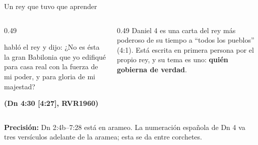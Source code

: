 \documentclass[hyperref={bookmarks=false},aspectratio=169]{beamer}
\newcommand{\fuente}[1]{\par\hfill{\upshape\bfseries\footnotesize\textcolor{azul}{#1}}}
\newcommand{\destacar}[1]{\textbf{\textcolor{azul}{#1}}}
\newcommand{\precision}[1]{{\footnotesize\color{gris}\textbf{Precisión:} #1}}
\begin{document}
\begin{frame}{Un rey que tuvo que aprender}
\centering
{}\par\medskip
\begin{columns}[t,onlytextwidth]
\begin{column}{0.49\textwidth}
\begin{cita}habló el rey y dijo: ¿No es ésta la gran Babilonia que yo edifiqué para casa real con la fuerza de mi poder, y para gloria de mi majestad?\fuente{(Dn 4:30 [4:27], RVR1960)}\end{cita}
\end{column}
\begin{column}{0.49\textwidth}\footnotesize
Daniel 4 es una carta del rey más poderoso de su tiempo a ``todos los pueblos'' (4:1). Está escrita en primera persona por el propio rey, y su tema es uno: \destacar{quién gobierna de verdad}.
\end{column}
\end{columns}
\precision{Dn 2:4b--7:28 está en arameo. La numeración española de Dn 4 va tres versículos adelante de la aramea; esta se da entre corchetes.}
\end{frame}
\end{document}
